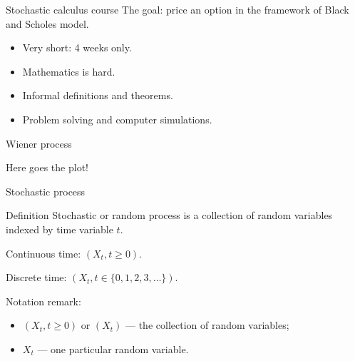 
\begin{frame} %


\end{frame}


\begin{frame}{Stochastic calculus course}
  The goal: price an option in the framework of Black and Scholes model. 

  \begin{itemize}[<+->]
    \item Very short: \alert{4 weeks} only.
    \item Mathematics is \alert{hard}.
    \item \alert{Informal} definitions and theorems. 
    \item \alert{Problem solving} and computer \alert{simulations}. 
  \end{itemize}

\end{frame}


\begin{frame}{Wiener process}

  Here goes the plot!

\end{frame}


\begin{frame}{Stochastic process}

  \begin{block}{Definition \formalduck}
    \alert{Stochastic} or \alert{random process} is a collection of random variables indexed by time variable $t$. 
    \pause

    \alert{Continuous time}: $(X_t, t\geq 0)$.
    \pause 
    
    \alert{Discrete time}: $(X_t, t\in \{0, 1, 2, 3, \ldots \})$. 
\end{block}

\pause 
Notation remark:
\begin{itemize}[<+->]
  \item $(X_t, t\geq 0)$ or $(X_t)$ — the collection of random variables;
  \item $X_t$ — one particular random variable. 
\end{itemize}


\end{frame}

